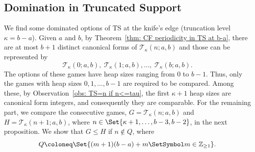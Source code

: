 \documentclass[oneside,reqno]{amsart}
\newcommand{\ts}{\mathcal{T}}
\begin{document}

\subsection*{Domination in Truncated Support}
We find some dominated options of {\sc TS} at the knife's edge (truncation level $\kappa=b-a$). %
Given $a$ and $b$, by Theorem~\ref{thm: CF periodicity in TS at b-a}, there are at most $b+1$ distinct canonical forms of $\ts_\kappa(n;a,b)$ and those can be represented by  $$\ts_\kappa(0;a,b),\;\ts_\kappa(1;a,b),\dots,\;\ts_\kappa(b;a,b).$$ The options of these games have heap sizes ranging from $0$ to $b-1$. Thus, only the games with heap sizes $0,1,\dots,b-1$ are required to be compared. Among these, by Observation~\ref{obs: TS=n if n<=tau}, the first $\kappa+1$ heap sizes are canonical form integers, and consequently they are comparable. For the remaining part, we compare the consecutive games, $G=\ts_{\kappa}(n;a,b)$ and $H=\ts_{\kappa}(n+1;a,b)$, where $n\in \Set{\kappa+1,\dots,b-3,b-2}$, in the next proposition. We show that $G\le H$ if $n\notin  Q$, where $$Q\coloneq\Set{(m+1)(b-a)+m\SetSymbol m\in \mathbb Z_{\geq 1}}.$$
\end{document}
